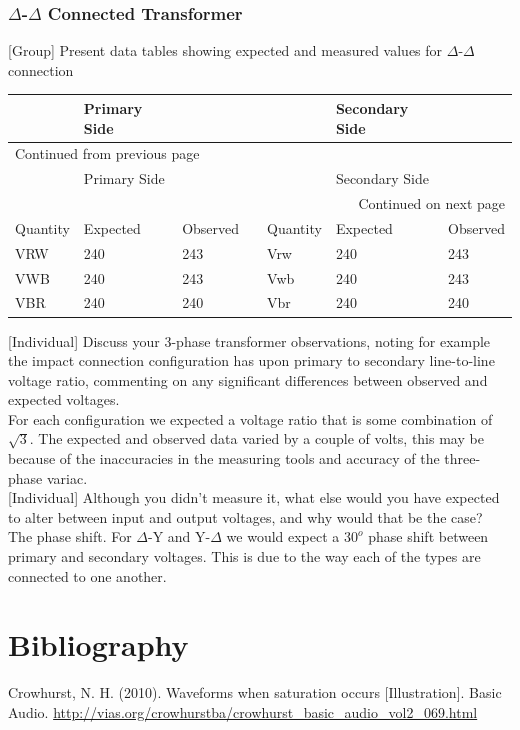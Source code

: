 \documentclass[11pt]{article}
\begin{document}
\subsubsection{\(\Delta\)-\(\Delta\) Connected Transformer}
\label{sec:org9687fc6}
{[}Group] Present data tables showing expected and measured values for \(\Delta\)-\(\Delta\) connection
\begin{longtable}{|l|l|l|l|l|l|l|}
\hline
 & Primary Side &  &  &  & Secondary Side & \\
\hline
\endfirsthead
\multicolumn{7}{l}{Continued from previous page} \\
\hline

 & Primary Side &  &  &  & Secondary Side &  \\

\hline
\endhead
\hline\multicolumn{7}{r}{Continued on next page} \\
\endfoot
\endlastfoot
\hline
Quantity & Expected & Observed &  & Quantity & Expected & Observed\\
\hline
VRW & 240 & 243 &  & Vrw & 240 & 243\\
\hline
VWB & 240 & 243 &  & Vwb & 240 & 243\\
\hline
VBR & 240 & 240 &  & Vbr & 240 & 240\\
\hline
\end{longtable}
{[}Individual] Discuss your 3-phase transformer observations, noting for example the impact connection configuration has upon primary to secondary line-to-line voltage ratio, commenting on any significant differences between observed and expected voltages. \\
For each configuration we expected a voltage ratio that is some combination of \(\sqrt{3}\). The expected and observed data varied by a couple of volts, this may be because of the inaccuracies in the measuring tools and accuracy of the three-phase variac. \\
{[}Individual] Although you didn’t measure it, what else would you have expected to alter between input and output voltages, and why would that be the case? \\
The phase shift. For \(\Delta\)-Y and Y-\(\Delta\) we would expect a \(30^o\) phase shift between primary and secondary voltages. This is due to the way each of the types are connected to one another.


\newpage
\section{Bibliography}
\label{sec:orge0dba18}
Crowhurst, N. H. (2010). Waveforms when saturation occurs [Illustration]. Basic Audio. \url{http://vias.org/crowhurstba/crowhurst\_basic\_audio\_vol2\_069.html}
\newpage
\end{document}
